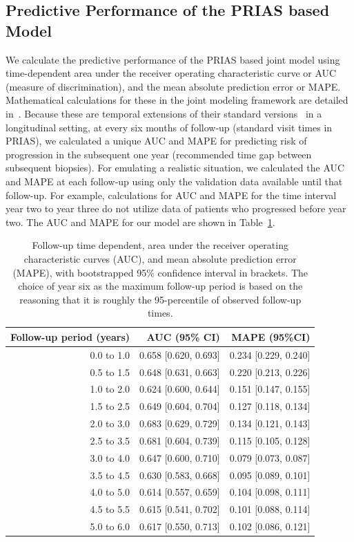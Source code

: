 \clearpage
\subsection{Predictive Performance of the PRIAS based Model}
We calculate the predictive performance of the PRIAS based joint model using time-dependent area under the receiver operating characteristic curve or AUC (measure of discrimination), and the mean absolute prediction error or MAPE. Mathematical calculations for these in the joint modeling framework are detailed in~\citet{landmarking2017}. Because these are temporal extensions of their standard versions~\citep{steyerberg2010assessing} in a longitudinal setting, at every six months of follow-up (standard visit times in PRIAS), we calculated a unique AUC and MAPE for predicting risk of progression in the subsequent one year (recommended time gap between subsequent biopsies). For emulating a realistic situation, we calculated the AUC and MAPE at each follow-up using only the validation data available until that follow-up. For example, calculations for AUC and MAPE for the time interval year two to year three do not utilize data of patients who progressed before year two. The AUC and MAPE for our model are shown in Table~\ref{tab:AUC_PE}.

\begin{table}[!htb]
\begin{center}
\caption{Follow-up time dependent, area under the receiver operating characteristic curves (AUC), and mean absolute prediction error (MAPE), with bootstrapped 95\% confidence interval in brackets. The choice of year six as the maximum follow-up period is based on the reasoning that it is roughly the 95-percentile of observed follow-up times.} 
\label{tab:AUC_PE}
\begin{tabular}{r|r|r}
\hline
\hline
Follow-up period (years) & AUC (95\% CI) & MAPE (95\%CI)\\ 
\hline
0.0 to 1.0 & 0.658 [0.620, 0.693] & 0.234 [0.229, 0.240]\\
0.5 to 1.5 & 0.648 [0.631, 0.663] & 0.220 [0.213, 0.226]\\
1.0 to 2.0 & 0.624 [0.600, 0.644] & 0.151 [0.147, 0.155]\\
1.5 to 2.5 & 0.649 [0.604, 0.704] & 0.127 [0.118, 0.134]\\
2.0 to 3.0 & 0.683 [0.629, 0.729] & 0.134 [0.121, 0.143]\\
2.5 to 3.5 & 0.681 [0.604, 0.739] & 0.115 [0.105, 0.128]\\
3.0 to 4.0 & 0.647 [0.600, 0.710] & 0.079 [0.073, 0.087]\\
3.5 to 4.5 & 0.630 [0.583, 0.668] & 0.095 [0.089, 0.101]\\
4.0 to 5.0 & 0.614 [0.557, 0.659] & 0.104 [0.098, 0.111]\\
4.5 to 5.5 & 0.615 [0.541, 0.702] & 0.101 [0.088, 0.114]\\
5.0 to 6.0 & 0.617 [0.550, 0.713] & 0.102 [0.086, 0.121]\\
\hline
\end{tabular}	
\end{center}
\end{table}